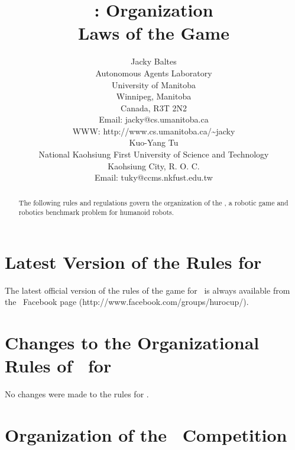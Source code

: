 \documentclass[12pt]{hurocup}
\begin{document}
\title{\HuroCup: Organization\\
  Laws of the Game \thisyear}

\author{Jacky Baltes\\
Autonomous Agents Laboratory\\
University of Manitoba\\
Winnipeg, Manitoba\\
Canada, R3T 2N2\\
Email: jacky@cs.umanitoba.ca\\
WWW: http://www.cs.umanitoba.ca/\~{ }jacky\\[5mm]
Kuo-Yang Tu\\
National Kaohsiung First University of Science and Technology\\
Kaohsiung City, R. O. C.\\
Email: tuky@ccms.nkfust.edu.tw\\
}

\maketitle
\begin{abstract}
The following rules and regulations govern the organization of the
\HuroCup, a robotic game and robotics benchmark problem for humanoid
robots.
%
\end{abstract}

\section*{Latest Version of the Rules for \HuroCup}
\label{sec:updates}

The latest official version of the rules of the game for \HuroCup\ is
always available from the \HuroCup\ Facebook page
(http://www.facebook.com/groups/hurocup/).

\section*{Changes to the Organizational Rules of \HuroCup\ for \thisyear}

No changes were made to the rules for \thisyear.

\newpage

\section{Organization of the \HuroCup\ Competition}
\label{sec:organization} 
\end{document}
